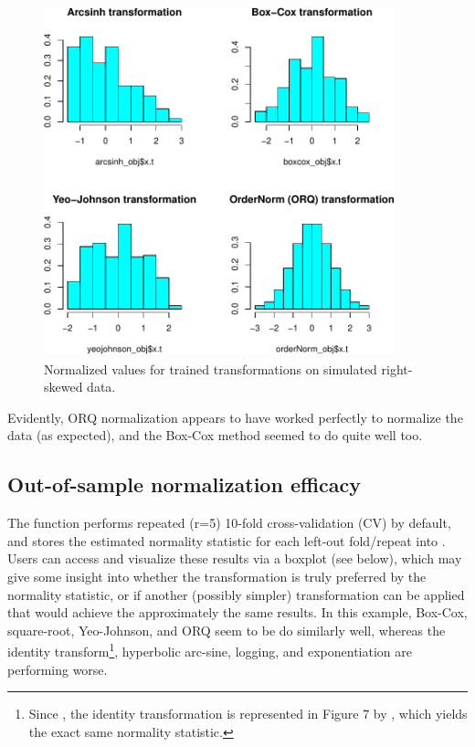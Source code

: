 \begin{Schunk}
\begin{figure}

{\centering \includegraphics[width=4in,height=4in]{figs/hist_trans-1} 

}

\caption[Normalized values for trained transformations on simulated right-skewed data]{Normalized values for trained transformations on simulated right-skewed data.}\label{fig:hist_trans}
\end{figure}
\end{Schunk}

Evidently, ORQ normalization appears to have worked perfectly to
normalize the data (as expected), and the Box-Cox method seemed to do
quite well too.

\hypertarget{out-of-sample-normalization-efficacy}{%
\subsection{Out-of-sample normalization
efficacy}\label{out-of-sample-normalization-efficacy}}

The  function performs repeated (r=5) 10-fold
cross-validation (CV) by default, and stores the estimated normality
statistic for each left-out fold/repeat into
. Users can access and visualize these
results via a boxplot (see below), which may give some insight into
whether the transformation is truly preferred by the normality
statistic, or if another (possibly simpler) transformation can be
applied that would achieve the approximately the same results. In this
example, Box-Cox, square-root, Yeo-Johnson, and ORQ seem to be do
similarly well, whereas the identity
transform\footnote{Since , the identity transformation is represented in Figure 7 by , which yields the exact same normality statistic.},
hyperbolic arc-sine, logging, and exponentiation are performing worse.

